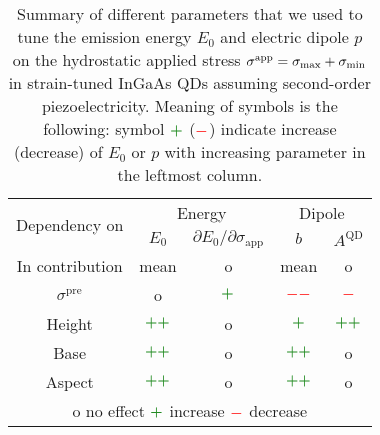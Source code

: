 \begin{table*}[ht!]
	\begin{center}
		\caption{Summary of different parameters that we used to tune the emission energy $E_0$ and electric dipole $p$ on the hydrostatic applied stress $\sigma^{\rm{app}}=\sigma_{\mathrm{max}}+\sigma_{\mathrm{min}}$ in strain-tuned InGaAs QDs assuming second-order piezoelectricity. Meaning of symbols is the following: symbol $\textcolor{ps_green}{\boldsymbol{+}}$ ($\textcolor{red}{\boldsymbol{-}}$) indicate increase (decrease) of $E_0$ or $p$ with increasing parameter in the leftmost column.  \label{tab:conclusion_straintuned} 
		}
		\begin{tabular}{c|cc|cc}
			\hline \hline
			\multirow{2}{*}{Dependency on} &  \multicolumn{2}{c|}{Energy} & \multicolumn{2}{c}{Dipole}\\ \cline{2-5}
			 &   $E_0$ & $\partial E_0/\partial\sigma_\mathrm{app}$  & $b$ & $A^{\mathrm{QD}}$\\  \hline
			  In contribution &  mean & o  & mean &o\\ \hline
			 $\sigma^\mathrm{pre}$ &  o &  $\textcolor{ps_green}{\boldsymbol{+}}$  & $\textcolor{red}{\boldsymbol{--}}$ &$\textcolor{red}{\boldsymbol{-}}$\\ \hline
			 Height&  $\textcolor{ps_green}{\boldsymbol{++}}$&  o  & $\textcolor{ps_green}{\boldsymbol{+}}$ &$\textcolor{ps_green}{\boldsymbol{++}}$\\ \hline
			 Base &  $\textcolor{ps_green}{\boldsymbol{++}}$&  o   &$\textcolor{ps_green}{\boldsymbol{++}}$ & o\\ \hline
			 Aspect &  $\textcolor{ps_green}{\boldsymbol{++}}$&  o   &$\textcolor{ps_green}{\boldsymbol{++}}$ & o\\ \hline
			 \multicolumn{5}{c}{o no effect \qquad $\textcolor{ps_green}{\boldsymbol{+}}$ increase \qquad $\textcolor{red}{\boldsymbol{-}}$ decrease }\\
			\hline \hline
		\end{tabular}
	\end{center}
\end{table*}


